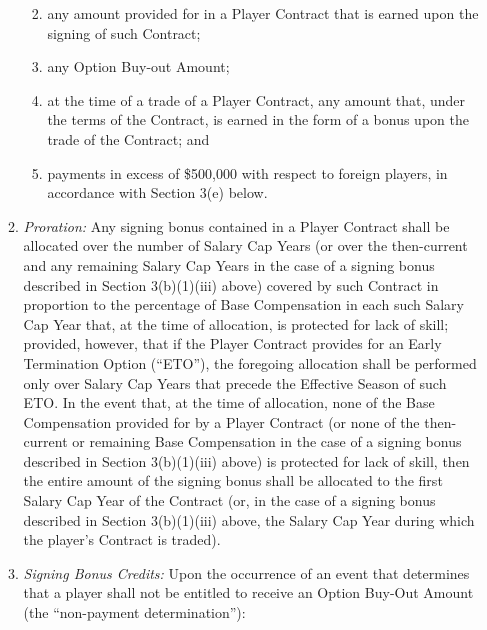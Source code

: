 \documentclass[
]{book}
\providecommand{\tightlist}{%
  \setlength{\itemsep}{0pt}\setlength{\parskip}{0pt}}
\begin{document}
\begin{enumerate}
\begin{enumerate}
    \begin{enumerate}
    \def\labelenumiii{(\roman{enumiii})}
    \tightlist
    \item
      any amount provided for in a Player Contract that is earned upon the signing of such Contract;
    \item
      any Option Buy-out Amount;
    \item
      at the time of a trade of a Player Contract, any amount that, under the terms of the Contract, is earned in the form of a bonus upon the trade of the Contract; and
    \item
      payments in excess of \$500,000 with respect to foreign players, in accordance with Section 3(e) below.
    \end{enumerate}
  \item
    \emph{Proration:} Any signing bonus contained in a Player Contract shall be allocated over the number of Salary Cap Years (or over the then-current and any remaining Salary Cap Years in the case of a signing bonus described in Section 3(b)(1)(iii) above) covered by such Contract in proportion to the percentage of Base Compensation in each such Salary Cap Year that, at the time of allocation, is protected for lack of skill; provided, however, that if the Player Contract provides for an Early Termination Option (``ETO''), the foregoing allocation shall be performed only over Salary Cap Years that precede the Effective Season of such ETO. In the event that, at the time of allocation, none of the Base Compensation provided for by a Player Contract (or none of the then-current or remaining Base Compensation in the case of a signing bonus described in Section 3(b)(1)(iii) above) is protected for lack of skill, then the entire amount of the signing bonus shall be allocated to the first Salary Cap Year of the Contract (or, in the case of a signing bonus described in Section 3(b)(1)(iii) above, the Salary Cap Year during which the player's Contract is traded).
  \item
    \emph{Signing Bonus Credits:} Upon the occurrence of an event that determines that a player shall not be entitled to receive an Option Buy-Out Amount (the ``non-payment determination''):


\end{enumerate}
\end{enumerate}
\end{document}

